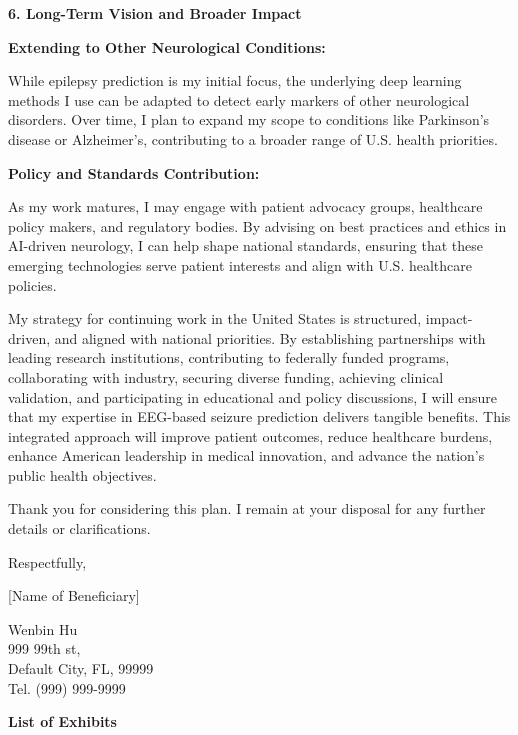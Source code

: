 \documentclass{article}
\begin{document}
{\bf 6. Long-Term Vision and Broader Impact } 

{\bf Extending to Other Neurological Conditions: }

While epilepsy prediction is my initial focus, the underlying deep learning methods I use can be adapted to detect early markers of other neurological disorders. Over time, I plan to expand my scope to conditions like Parkinson’s disease or Alzheimer’s, contributing to a broader range of U.S. health priorities.

{\bf Policy and Standards Contribution: }

As my work matures, I may engage with patient advocacy groups, healthcare policy makers, and regulatory bodies. By advising on best practices and ethics in AI-driven neurology, I can help shape national standards, ensuring that these emerging technologies serve patient interests and align with U.S. healthcare policies.

My strategy for continuing work in the United States is structured, impact-driven, and aligned with national priorities. By establishing partnerships with leading research institutions, contributing to federally funded programs, collaborating with industry, securing diverse funding, achieving clinical validation, and participating in educational and policy discussions, I will ensure that my expertise in EEG-based seizure prediction delivers tangible benefits. This integrated approach will improve patient outcomes, reduce healthcare burdens, enhance American leadership in medical innovation, and advance the nation’s public health objectives.

Thank you for considering this plan. I remain at your disposal for any further details or clarifications.

Respectfully,

[Name of Beneficiary]

\vspace{5\baselineskip}

Wenbin Hu\\
999 99th st,\\
Default City, FL, 99999\\
Tel. (999) 999-9999


\clearpage

{\bf List of Exhibits}
\label{exhib}
\end{document}
